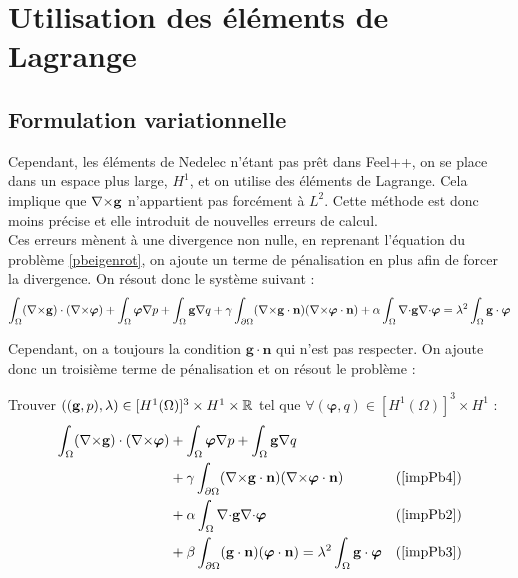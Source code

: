 \section{Utilisation des éléments de Lagrange}
\subsection{Formulation variationnelle}
Cependant, les éléments de Nedelec n'étant pas prêt dans Feel++, on se place dans un espace plus large, $H^1$, et on utilise des éléments de Lagrange. Cela implique que ${\nabla\times}\mathbf{g}$ n'appartient pas forcément à $L^2$. Cette méthode est donc moins précise et elle introduit de nouvelles erreurs de calcul.\\

Ces erreurs mènent à une divergence non nulle, en reprenant l'équation du problème \ref{pbeigenrot}, on ajoute un terme de pénalisation en plus afin de forcer la divergence. On résout donc le système suivant :
\[ \int_\Omega ({\nabla\times}\mathbf{g})\cdot({\nabla\times}\bm{\varphi}) + \int_\Omega\bm{\varphi}{\nabla} p + \int_\Omega \mathbf{g}{\nabla} q + \gamma\int_{\partial\Omega}({\nabla\times}\mathbf{g}\cdot\mathbf{n})({\nabla\times}\bm{\varphi}\cdot\mathbf{n}) + \alpha\int_\Omega {\nabla\cdot}\mathbf{g}{\nabla\cdot}\bm{\varphi} = \lambda^2\int_\Omega \mathbf{g}\cdot\bm{\varphi} \]

Cependant, on a toujours la condition $\mathbf{g}\cdot\mathbf{n}$ qui n'est pas respecter. On ajoute donc un troisième terme de pénalisation et on résout le problème :
\begin{pb}\label{pbeigenh1}
Trouver $((\mathbf{g},p),\lambda)\in [H^1(\Omega)]^3\times H^1 \times {\mathbb{R}}$ tel que $\forall (\bm{\varphi},q)\in [H^1(\Omega)]^3\times H^1$ :
\begin{align*}
\int_\Omega ({\nabla\times}\mathbf{g})\cdot({\nabla\times}\bm{\varphi}) &+ \int_\Omega\bm{\varphi}{\nabla} p + \int_\Omega \mathbf{g}{\nabla} q & \\
&+ \gamma\int_{\partial\Omega}({\nabla\times}\mathbf{g}\cdot\mathbf{n})({\nabla\times}\bm{\varphi}\cdot\mathbf{n}) & (\ref{impPb4})\\
& + \alpha\int_\Omega {\nabla\cdot}\mathbf{g}{\nabla\cdot}\bm{\varphi} & (\ref{impPb2})\\
&+ \beta\int_{\partial\Omega}(\mathbf{g}\cdot\mathbf{n})(\bm{\varphi}\cdot\mathbf{n})  = \lambda^2\int_\Omega \mathbf{g}\cdot\bm{\varphi} & (\ref{impPb3})
\end{align*} \end{pb}

